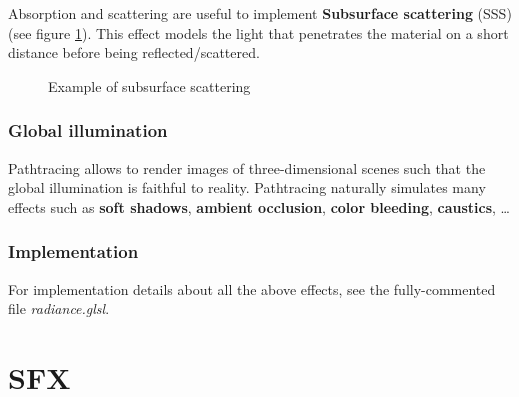 \documentclass[a4paper,10pt]{article}
\begin{document}
\noindent
Absorption and scattering are useful to implement \textbf{Subsurface scattering} (SSS) (see figure \ref{sss}). This effect models the light that penetrates the material on a short distance  before being reflected/scattered.


\begin{figure}[!Htb]\centering
    \label{sss}
    \caption{Example of subsurface scattering}
\end{figure}

\subsubsection{Global illumination}

Pathtracing allows to render images of three-dimensional scenes such that the global illumination is faithful to reality. Pathtracing naturally simulates many effects such as \textbf{soft shadows}, \textbf{ambient occlusion}, \textbf{color bleeding}, \textbf{caustics}, \ldots

\subsubsection{Implementation}
For implementation details about all the above effects, see the fully-commented file \textit{radiance.glsl}.

\section{SFX}
\end{document}
